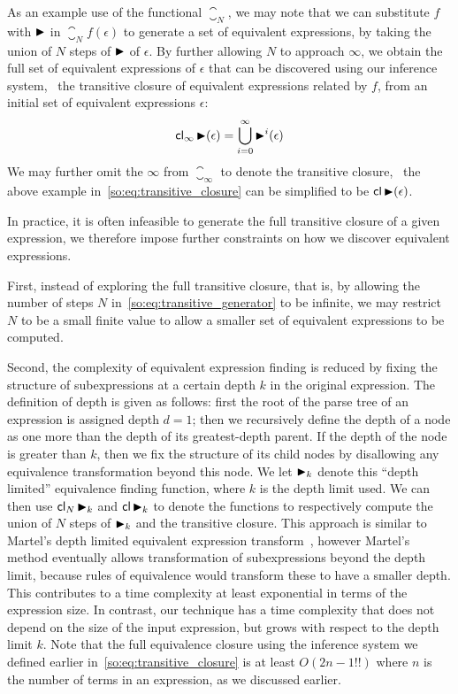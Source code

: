 As an example use of the functional $\closure_N$, we may note that we can
substitute $f$ with $\operatorname{\blacktriangleright}$ in $\closure_N f (\epsilon)$ to generate a set
of equivalent expressions, by taking the union of $N$ steps of $\operatorname{\blacktriangleright}$ of
$\epsilon$.  By further allowing $N$ to approach $\infty$, we obtain the full
set of equivalent expressions of $\epsilon$ that can be discovered using our
inference system, \ie~the transitive closure of equivalent expressions related
by $f$, from an initial set of equivalent expressions $\epsilon$:
\begin{equation}
    \mathsf{cl}_\infty \operatorname{\blacktriangleright} (\epsilon) =
        \bigcup_{i = 0}^\infty \operatorname{\blacktriangleright}^i(\epsilon)
    \label{so:eq:transitive_closure}
\end{equation}
We may further omit the $\infty$ from $\closure_\infty$ to denote the
transitive closure, \eg~the above example in~\ref{so:eq:transitive_closure} can
be simplified to be $\mathsf{cl} \operatorname{\blacktriangleright} (\epsilon)$.

In practice, it is often infeasible to generate the full transitive closure of
a given expression, we therefore impose further constraints on how we discover
equivalent expressions.

First, instead of exploring the full transitive closure, that is, by allowing
the number of steps $N$ in~\eqref{so:eq:transitive_generator} to be infinite,
we may restrict $N$ to be a small finite value to allow a smaller set of
equivalent expressions to be computed.

Second, the complexity of equivalent expression finding is reduced by fixing
the structure of subexpressions at a certain depth $k$ in the original
expression.  The definition of depth is given as follows: first the root of
the parse tree of an expression is assigned depth $d = 1$; then we recursively
define the depth of a node as one more than the depth of its greatest-depth
parent.  If the depth of the node is greater than $k$, then we fix the
structure of its child nodes by disallowing any equivalence transformation
beyond this node. We let $\operatorname{\blacktriangleright}_k$ denote this ``depth limited'' equivalence
finding function, where $k$ is the depth limit used.  We can then use
$\mathsf{cl}_N \operatorname{\blacktriangleright}_k$ and $\mathsf{cl} \operatorname{\blacktriangleright}_k$ to denote the functions to
respectively compute the union of $N$ steps of $\operatorname{\blacktriangleright}_k$ and the transitive
closure. This approach is similar to Martel's depth limited equivalent
expression transform~\cite{martel07}, however Martel's method eventually allows
transformation of subexpressions beyond the depth limit, because rules of
equivalence would transform these to have a smaller depth.  This contributes
to a time complexity at least exponential in terms of the expression size. In
contrast, our technique has a time complexity that does not depend on the size
of the input expression, but grows with respect to the depth limit $k$. Note
that the full equivalence closure using the inference system we defined earlier
in~\eqref{so:eq:transitive_closure} is at least $O({2n - 1}!!)$ where $n$ is
the number of terms in an expression, as we discussed earlier.

